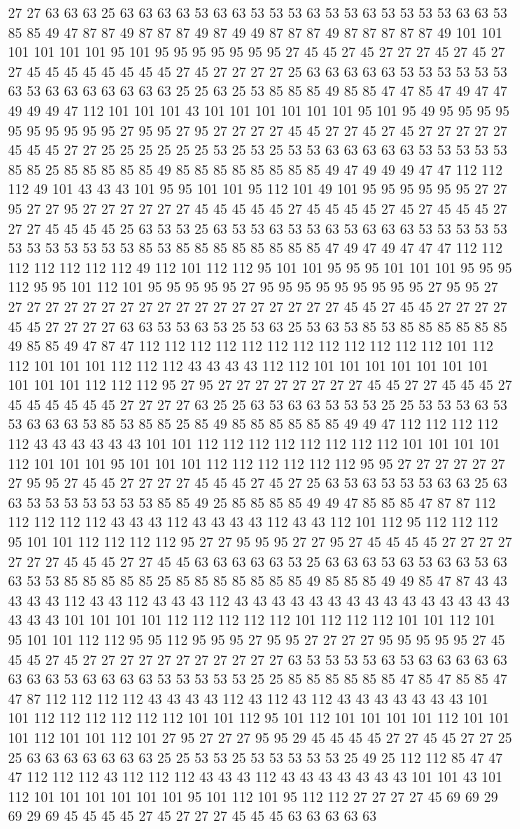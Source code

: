 27 27 63 63 63 25 63 63 63 63 53 63 63 53 53 53 63 53 53 63 53 53 53 53 63 63 53 85 85 49 47 87 87 49 87 87 87 49 87 49 49 87 87 87 49 87 87 87 87 87 49 101 101 101 101 101 101 95 101 95 95 95 95 95 95 95 27 45 45 27 45 27 27 27 45 27 45 27 27 45 45 45 45 45 45 45 45 27 45 27 27 27 27 25 63 63 63 63 63 53 53 53 53 53 53 63 53 63 63 63 63 63 63 63 25 25 63 25 53 85 85 85 49 85 85 47 47 85 47 49 47 47 49 49 49 47 112 101 101 101 43 101 101 101 101 101 101 95 101 95 49 95 95 95 95 95 95 95 95 95 95 27 95 95 27 95 27 27 27 27 45 45 27 27 45 27 45 27 27 27 27 27 45 45 45 27 27 25 25 25 25 25 25 53 25 53 25 53 53 63 63 63 63 63 53 53 53 53 53 85 85 25 85 85 85 85 85 49 85 85 85 85 85 85 85 85 49 47 49 49 49 47 47 112 112 112 49 101 43 43 43 101 95 95 101 101 95 112 101 49 101 95 95 95 95 95 95 27 27 95 27 27 95 27 27 27 27 27 27 45 45 45 45 45 27 45 45 45 45 27 45 27 45 45 45 27 27 27 45 45 45 45 25 63 53 53 25 63 53 53 63 53 53 63 53 63 63 63 53 53 53 53 53 53 53 53 53 53 53 53 85 53 85 85 85 85 85 85 85 85 47 49 47 49 47 47 47 112 112 112 112 112 112 112 49 112 101 112 112 95 101 101 95 95 95 101 101 101 95 95 95 112 95 95 101 112 101 95 95 95 95 95 27 95 95 95 95 95 95 95 95 95 27 95 95 27 27 27 27 27 27 27 27 27 27 27 27 27 27 27 27 27 27 27 45 45 27 45 45 27 27 27 27 45 45 27 27 27 27 63 63 53 53 63 53 25 53 63 25 53 63 53 85 53 85 85 85 85 85 85 49 85 85 49 47 87 47 112 112 112 112 112 112 112 112 112 112 112 112 101 112 112 101 101 101 112 112 112 43 43 43 43 112 112 101 101 101 101 101 101 101 101 101 101 112 112 112 95 27 95 27 27 27 27 27 27 27 27 45 45 27 27 45 45 45 27 45 45 45 45 45 45 27 27 27 27 63 25 25 63 53 63 63 53 53 53 25 25 53 53 53 63 53 53 63 63 63 53 85 53 85 85 25 85 49 85 85 85 85 85 85 49 49 47 112 112 112 112 112 43 43 43 43 43 43 101 101 112 112 112 112 112 112 112 112 101 101 101 101 112 101 101 101 95 101 101 101 112 112 112 112 112 112 95 95 27 27 27 27 27 27 27 95 95 27 45 45 27 27 27 27 45 45 45 27 45 27 25 63 53 63 53 53 53 63 63 25 63 63 53 53 53 53 53 53 53 85 85 49 25 85 85 85 85 49 49 47 85 85 85 47 87 87 112 112 112 112 112 43 43 43 112 43 43 43 43 112 43 43 112 101 112 95 112 112 112 95 101 101 112 112 112 112 95 27 27 95 95 95 27 27 95 27 45 45 45 45 27 27 27 27 27 27 27 45 45 45 27 27 45 45 63 63 63 63 63 53 25 63 63 63 53 63 53 63 63 53 63 63 53 53 85 85 85 85 85 25 85 85 85 85 85 85 85 49 85 85 85 49 49 85 47 87 43 43 43 43 43 112 43 43 112 43 43 43 112 43 43 43 43 43 43 43 43 43 43 43 43 43 43 43 43 43 43 101 101 101 101 112 112 112 112 112 101 112 112 112 101 101 112 101 95 101 101 112 112 95 95 112 95 95 95 27 95 95 27 27 27 27 95 95 95 95 95 27 45 45 45 27 45 27 27 27 27 27 27 27 27 27 27 27 63 53 53 53 53 63 53 63 63 63 63 63 63 63 63 53 63 63 63 63 53 53 53 53 53 25 25 85 85 85 85 85 85 47 85 47 85 85 47 47 87 112 112 112 112 43 43 43 43 112 43 112 43 112 43 43 43 43 43 43 43 101 101 112 112 112 112 112 112 101 101 112 95 101 112 101 101 101 101 112 101 101 101 112 101 101 112 101 27 95 27 27 27 95 95 29 45 45 45 45 27 27 45 45 27 27 25 25 63 63 63 63 63 63 63 25 25 53 53 25 53 53 53 53 53 25 49 25 112 112 85 47 47 47 112 112 112 43 112 112 112 43 43 43 112 43 43 43 43 43 43 43 101 101 43 101 112 101 101 101 101 101 101 95 101 112 101 95 112 112 27 27 27 27 45 69 69 29 69 29 69 45 45 45 45 27 45 27 27 27 45 45 45 63 63 63 63 63 